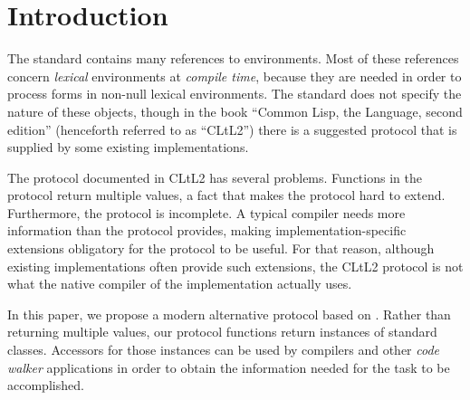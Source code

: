 \section{Introduction}

The \commonlisp{} standard \cite{ansi:common:lisp} contains many
references to environments.  Most of these references concern
\emph{lexical} environments at \emph{compile time}, because they are
needed in order to process forms in non-null lexical environments.
The standard does not specify the nature of these objects, though in
the book ``Common Lisp, the Language, second edition''
\cite{Steele:1990:CLL:95411} (henceforth referred to as ``CLtL2'')
there is a suggested protocol that is supplied by some existing
\commonlisp{} implementations.

The protocol documented in CLtL2 has several problems.  Functions in
the protocol return multiple values, a fact that makes the protocol
hard to extend.  Furthermore, the protocol is incomplete.  A typical
compiler needs more information than the protocol provides, making
implementation-specific extensions obligatory for the protocol to be
useful.  For that reason, although existing \commonlisp{}
implementations often provide such extensions, the CLtL2 protocol is
not what the native compiler of the implementation actually uses.

In this paper, we propose a modern alternative protocol based on
\clos{}.  Rather than returning multiple values, our protocol
functions return instances of standard classes.  Accessors for those
instances can be used by compilers and other \emph{code walker}
applications in order to obtain the information needed for the task to
be accomplished.


